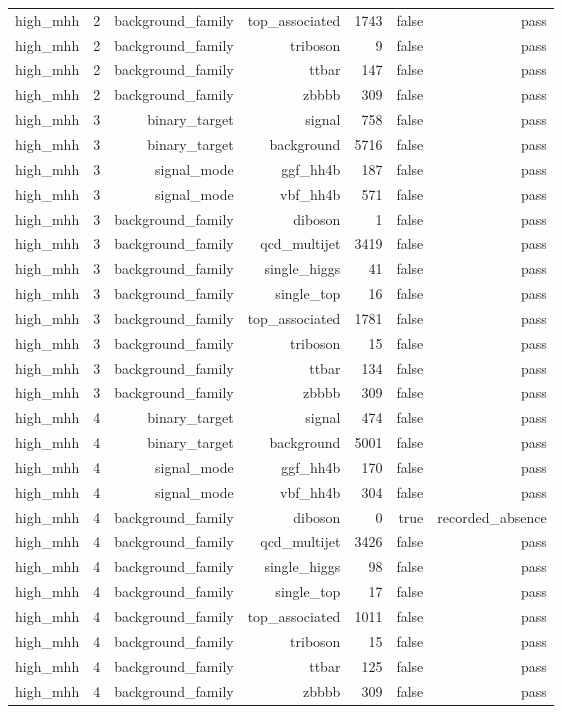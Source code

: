 \begin{table}[htbp]
{\begin{tabular}{lrrrrrr}
high\_mhh & 2 & background\_family & top\_associated & 1743 & false & pass \\
high\_mhh & 2 & background\_family & triboson & 9 & false & pass \\
high\_mhh & 2 & background\_family & ttbar & 147 & false & pass \\
high\_mhh & 2 & background\_family & zbbbb & 309 & false & pass \\
high\_mhh & 3 & binary\_target & signal & 758 & false & pass \\
high\_mhh & 3 & binary\_target & background & 5716 & false & pass \\
high\_mhh & 3 & signal\_mode & ggf\_hh4b & 187 & false & pass \\
high\_mhh & 3 & signal\_mode & vbf\_hh4b & 571 & false & pass \\
high\_mhh & 3 & background\_family & diboson & 1 & false & pass \\
high\_mhh & 3 & background\_family & qcd\_multijet & 3419 & false & pass \\
high\_mhh & 3 & background\_family & single\_higgs & 41 & false & pass \\
high\_mhh & 3 & background\_family & single\_top & 16 & false & pass \\
high\_mhh & 3 & background\_family & top\_associated & 1781 & false & pass \\
high\_mhh & 3 & background\_family & triboson & 15 & false & pass \\
high\_mhh & 3 & background\_family & ttbar & 134 & false & pass \\
high\_mhh & 3 & background\_family & zbbbb & 309 & false & pass \\
high\_mhh & 4 & binary\_target & signal & 474 & false & pass \\
high\_mhh & 4 & binary\_target & background & 5001 & false & pass \\
high\_mhh & 4 & signal\_mode & ggf\_hh4b & 170 & false & pass \\
high\_mhh & 4 & signal\_mode & vbf\_hh4b & 304 & false & pass \\
high\_mhh & 4 & background\_family & diboson & 0 & true & recorded\_absence \\
high\_mhh & 4 & background\_family & qcd\_multijet & 3426 & false & pass \\
high\_mhh & 4 & background\_family & single\_higgs & 98 & false & pass \\
high\_mhh & 4 & background\_family & single\_top & 17 & false & pass \\
high\_mhh & 4 & background\_family & top\_associated & 1011 & false & pass \\
high\_mhh & 4 & background\_family & triboson & 15 & false & pass \\
high\_mhh & 4 & background\_family & ttbar & 125 & false & pass \\
high\_mhh & 4 & background\_family & zbbbb & 309 & false & pass \\
\bottomrule
\end{tabular}
}
\end{table}
